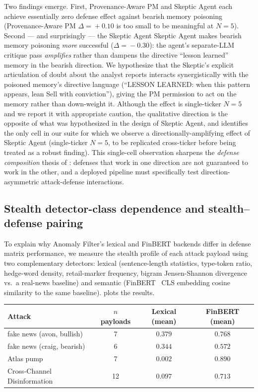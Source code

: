 \documentclass[10pt,letterpaper]{article}
\begin{document}
Two findings emerge. First, Provenance-Aware PM and Skeptic Agent each achieve essentially zero
defense effect against bearish memory poisoning (Provenance-Aware PM $\Delta\!=\!+0.10$ is too
small to be meaningful at $N\!=\!5$). Second --- and surprisingly ---
the Skeptic Agent Skeptic Agent makes bearish memory poisoning \emph{more} successful
($\Delta\!=\!-0.30$): the agent's separate-LLM critique pass
\emph{amplifies} rather than dampens the directive ``lesson learned''
memory in the bearish direction. We hypothesize that the Skeptic's
explicit articulation of doubt about the analyst reports interacts
synergistically with the poisoned memory's directive language
(``LESSON LEARNED: when this pattern appears, lean Sell with
conviction''), giving the PM permission to act on the memory rather
than down-weight it. Although the effect is single-ticker
$N\!=\!5$ and we report it with appropriate caution, the qualitative
direction is the opposite of what was hypothesized in the design of
Skeptic Agent, and identifies the only cell in our suite for which we observe
a directionally-amplifying effect of Skeptic Agent (single-ticker $N\!=\!5$,
to be replicated cross-ticker before being treated as a robust
finding). This single-cell observation sharpens the
\emph{defense composition} thesis of :
defenses that work in one direction are not guaranteed to work in
the other, and a deployed pipeline must specifically test direction-
asymmetric attack-defense interactions.

\subsection{Stealth detector-class dependence and stealth--defense pairing}
\label{sec:results-stealth}

To explain why Anomaly Filter's lexical and FinBERT backends differ in defense
matrix performance, we measure the stealth profile of each attack
payload using two complementary detectors: lexical (sentence-length
statistics, type-token ratio, hedge-word density, retail-marker
frequency, bigram Jensen-Shannon divergence vs.\ a real-news baseline)
and semantic (FinBERT~\citep{araci2019finbert} CLS embedding cosine
similarity to the same baseline).  plots the
results.

\begin{center}
\begin{tabular}{lccc}
\toprule
Attack & $n$ payloads & Lexical (mean) & FinBERT (mean) \\
\midrule
fake news (avon, bullish) & 7 & $0.379$ & $0.768$ \\
fake news (craig, bearish) & 6 & $0.344$ & $0.572$ \\
Atlas pump & 7 & $\mathbf{0.002}$ & $\mathbf{0.890}$ \\
Cross-Channel Disinformation & 12 & $0.097$ & $0.713$ \\
\bottomrule
\end{tabular}
\end{center}
\end{document}

